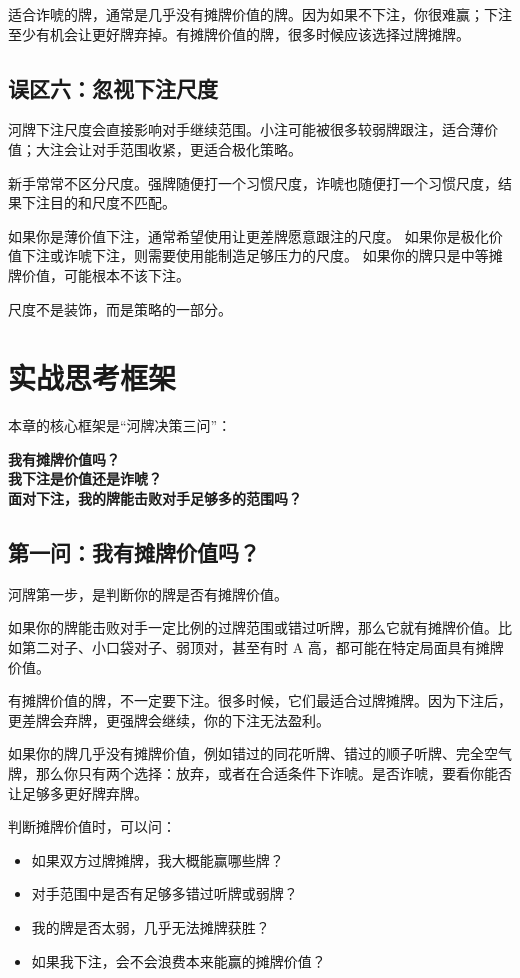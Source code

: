 适合诈唬的牌，通常是几乎没有摊牌价值的牌。因为如果不下注，你很难赢；下注至少有机会让更好牌弃掉。有摊牌价值的牌，很多时候应该选择过牌摊牌。

\subsection{误区六：忽视下注尺度}

河牌下注尺度会直接影响对手继续范围。小注可能被很多较弱牌跟注，适合薄价值；大注会让对手范围收紧，更适合极化策略。

新手常常不区分尺度。强牌随便打一个习惯尺度，诈唬也随便打一个习惯尺度，结果下注目的和尺度不匹配。

如果你是薄价值下注，通常希望使用让更差牌愿意跟注的尺度。
如果你是极化价值下注或诈唬下注，则需要使用能制造足够压力的尺度。
如果你的牌只是中等摊牌价值，可能根本不该下注。

尺度不是装饰，而是策略的一部分。

\section{实战思考框架}

本章的核心框架是“河牌决策三问”：

\begin{center}
\textbf{我有摊牌价值吗？\\
我下注是价值还是诈唬？\\
面对下注，我的牌能击败对手足够多的范围吗？}
\end{center}

\subsection{第一问：我有摊牌价值吗？}

河牌第一步，是判断你的牌是否有摊牌价值。

如果你的牌能击败对手一定比例的过牌范围或错过听牌，那么它就有摊牌价值。比如第二对子、小口袋对子、弱顶对，甚至有时 A 高，都可能在特定局面具有摊牌价值。

有摊牌价值的牌，不一定要下注。很多时候，它们最适合过牌摊牌。因为下注后，更差牌会弃牌，更强牌会继续，你的下注无法盈利。

如果你的牌几乎没有摊牌价值，例如错过的同花听牌、错过的顺子听牌、完全空气牌，那么你只有两个选择：放弃，或者在合适条件下诈唬。是否诈唬，要看你能否让足够多更好牌弃牌。

判断摊牌价值时，可以问：

\begin{itemize}
\item 如果双方过牌摊牌，我大概能赢哪些牌？
\item 对手范围中是否有足够多错过听牌或弱牌？
\item 我的牌是否太弱，几乎无法摊牌获胜？
\item 如果我下注，会不会浪费本来能赢的摊牌价值？
\end{itemize}


